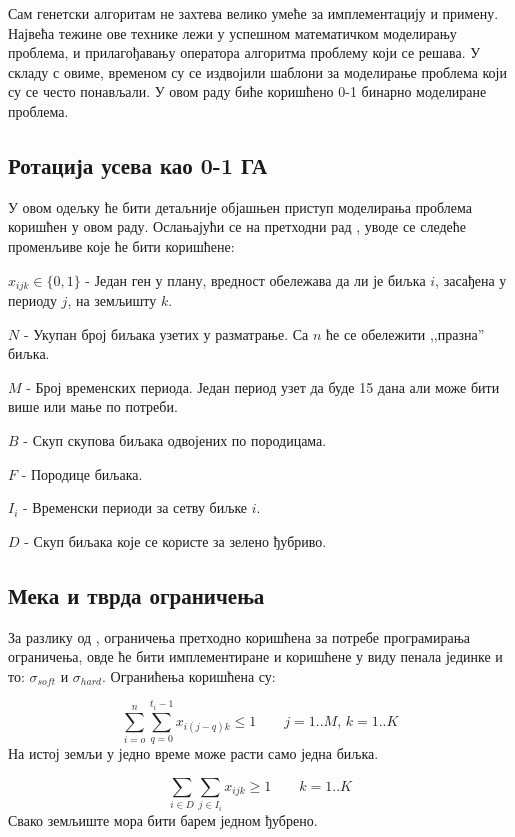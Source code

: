 \documentclass[12pt,fleqn]{article}
\begin{document}
Сам генетски алгоритам не захтева велико умеће за имплементацију и примену. Највећа тежине ове технике лежи у успешном математичком моделирању проблема, и прилагођавању оператора алгоритма проблему који се решава. У складу с овиме, временом су се издвојили шаблони за моделирање проблема који су се често понављали. У овом раду биће коришћено 0-1 бинарно моделиране проблема.

\subsection{Ротација усева као 0-1 ГА}

У овом одељку ће бити детаљније објашњен приступ моделирања проблема коришћен у овом раду. Ослањајући се на претходни рад \cite{geraldi}, уводе се следеће променљиве које ће бити коришћене:

$x_{ijk} \in \{0,1\}$ - Један ген у плану, вредност обележава да ли је биљка $i$, засађена у периоду $j$, на земљишту $k$.

$N$ - Укупан број биљака узетих у разматрање. Са $n$ ће се обележити ,,празна'' биљка.

$M$ - Број временских периода. Један период узет да буде 15 дана али може бити више или мање по потреби.

$B$ - Скуп скупова биљака одвојених по породицама.

$F$ - Породице биљака.

$I_i$ - Временски периоди за сетву биљке $i$.

$D$ - Скуп биљака које се користе за зелено ђубриво.

\subsection{Мека и тврда ограничења}
За разлику од \cite{geraldi}, ограничења претходно коришћена за потребе програмирања ограничења, овде ће бити имплементиране и коришћене у виду пенала јединке и то: $\sigma_{soft}$ и $\sigma_{hard}$. Огранићења коришћена су:

\begin{minipage}{\textwidth}
\begin{equation}
  \sum_{i=o}^n \sum_{q=0}^{t_i-1} x_{i(j-q)k} \le 1 \qquad j = 1..M,\, k = 1..K
\end{equation}
На истој земљи у једно време може расти само једна биљка.
\end{minipage}

\begin{minipage}{\textwidth}
\begin{equation}
      \sum_{i\in D} \sum_{j\in I_i}x_{ijk} \ge 1 \qquad k = 1..K
    \end{equation}
    Свако земљиште мора бити барем једном ђубрено.
\end{minipage}
\end{document}
